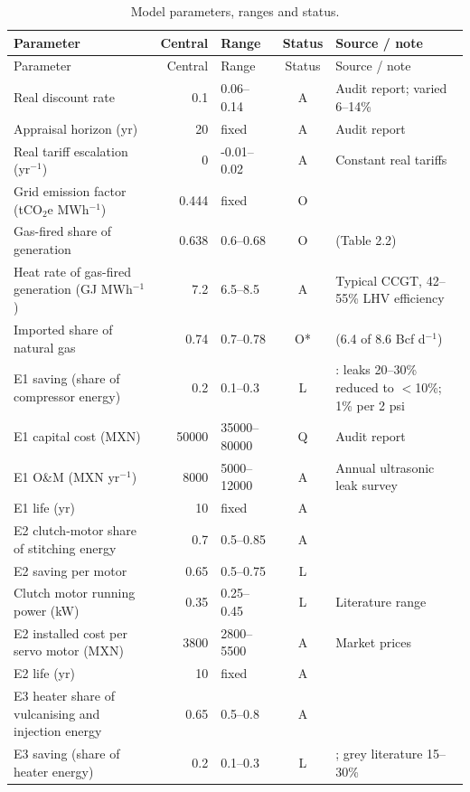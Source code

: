 {\footnotesize
\begin{longtable}{p{4.4cm}rlcp{4.0cm}}
\caption{Model parameters, ranges and status.}\label{tab:parameters}\\
\toprule
Parameter & Central & Range & Status & Source / note \\
\midrule
\endfirsthead
\toprule
Parameter & Central & Range & Status & Source / note \\
\midrule
\endhead
Real discount rate & 0.1 & 0.06--0.14 & A & Audit report; varied 6--14\% \\
Appraisal horizon (yr) & 20 & fixed & A & Audit report \\
Real tariff escalation (yr$^{-1}$) & 0 & -0.01--0.02 & A & Constant real tariffs \\
Grid emission factor (tCO$_2$e MWh$^{-1}$) & 0.444 & fixed & O & \cite{semarnat2025fesen} \\
Gas-fired share of generation & 0.638 & 0.6--0.68 & O & \cite{sener2025plan} (Table 2.2) \\
Heat rate of gas-fired generation (GJ MWh$^{-1}$) & 7.2 & 6.5--8.5 & A & Typical CCGT, 42--55\% LHV efficiency \\
Imported share of natural gas & 0.74 & 0.7--0.78 & O* & \cite{eia2025mexico} (6.4 of 8.6 Bcf d$^{-1}$) \\
E1 saving (share of compressor energy) & 0.2 & 0.1--0.3 & L & \cite{doe2016compressed}: leaks 20--30\% reduced to $<$10\%; 1\% per 2 psi \\
E1 capital cost (MXN) & 50000 & 35000--80000 & Q & Audit report \\
E1 O\&M (MXN yr$^{-1}$) & 8000 & 5000--12000 & A & Annual ultrasonic leak survey \\
E1 life (yr) & 10 & fixed & A &  \\
E2 clutch-motor share of stitching energy & 0.7 & 0.5--0.85 & A &  \\
E2 saving per motor & 0.65 & 0.5--0.75 & L & \cite{nemesa2023} \\
Clutch motor running power (kW) & 0.35 & 0.25--0.45 & L & Literature range \\
E2 installed cost per servo motor (MXN) & 3800 & 2800--5500 & A & Market prices \\
E2 life (yr) & 10 & fixed & A &  \\
E3 heater share of vulcanising and injection energy & 0.65 & 0.5--0.8 & A &  \\
E3 saving (share of heater energy) & 0.2 & 0.1--0.3 & L & \cite{kent2018}; grey literature 15--30\% \\

\end{longtable}}
